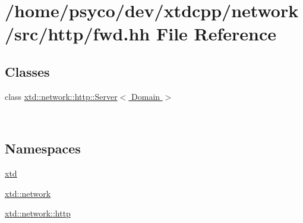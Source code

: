 \hypertarget{fwd_8hh}{}\section{/home/psyco/dev/xtdcpp/network/src/http/fwd.hh File Reference}
\label{fwd_8hh}
\subsection*{Classes}
\begin{DoxyCompactItemize}
\item 
class \hyperlink{classxtd_1_1network_1_1http_1_1Server}{xtd\+::network\+::http\+::\+Server$<$ Domain $>$}
\begin{DoxyCompactList}\small\item\em ~\newline
~\newline
 \end{DoxyCompactList}\end{DoxyCompactItemize}
\subsection*{Namespaces}
\begin{DoxyCompactItemize}
\item 
 \hyperlink{namespacextd}{xtd}
\item 
 \hyperlink{namespacextd_1_1network}{xtd\+::network}
\item 
 \hyperlink{namespacextd_1_1network_1_1http}{xtd\+::network\+::http}
\end{DoxyCompactItemize}
